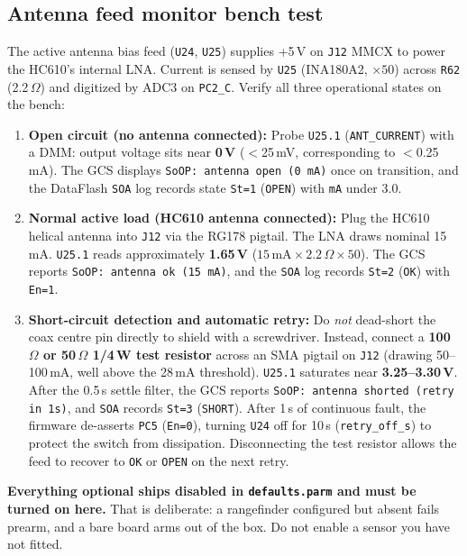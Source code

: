 \documentclass[11pt,a4paper]{article}
\newcommand{\file}[1]{\texttt{\small #1}}
\newcommand{\cmd}[1]{\texttt{\small #1}}
\begin{document}
\subsection{Antenna feed monitor bench test}
\label{sec:ant_bench}
The active antenna bias feed (\file{U24}, \file{U25}) supplies +5\,V on \file{J12} MMCX to power the HC610's internal LNA. Current is sensed by \file{U25} (INA180A2, $\times 50$) across \file{R62} (2.2\,$\Omega$) and digitized by ADC3 on \file{PC2\_C}. Verify all three operational states on the bench:
\begin{enumerate}
\item \textbf{Open circuit (no antenna connected):} Probe \file{U25.1} (\file{ANT\_CURRENT}) with a DMM: output voltage sits near \textbf{0\,V} ($<$25\,mV, corresponding to $<$0.25\,mA). The GCS displays \cmd{SoOP: antenna open (0 mA)} once on transition, and the DataFlash \file{SOA} log records state \file{St=1} (\cmd{OPEN}) with \file{mA} under 3.0.
\item \textbf{Normal active load (HC610 antenna connected):} Plug the HC610 helical antenna into \file{J12} via the RG178 pigtail. The LNA draws nominal 15\,mA. \file{U25.1} reads approximately \textbf{1.65\,V} ($15\,\mathrm{mA} \times 2.2\,\Omega \times 50$). The GCS reports \cmd{SoOP: antenna ok (15 mA)}, and the \file{SOA} log records \file{St=2} (\cmd{OK}) with \file{En=1}.
\item \textbf{Short-circuit detection and automatic retry:} Do \emph{not} dead-short the coax centre pin directly to shield with a screwdriver. Instead, connect a \textbf{100\,$\Omega$ or 50\,$\Omega$ 1/4\,W test resistor} across an SMA pigtail on \file{J12} (drawing 50--100\,mA, well above the 28\,mA threshold). \file{U25.1} saturates near \textbf{3.25--3.30\,V}. After the 0.5\,s settle filter, the GCS reports \cmd{SoOP: antenna shorted (retry in 1s)}, and \file{SOA} records \file{St=3} (\cmd{SHORT}). After 1\,s of continuous fault, the firmware de-asserts \file{PC5} (\cmd{En=0}), turning \file{U24} off for 10\,s (\file{retry\_off\_s}) to protect the switch from dissipation. Disconnecting the test resistor allows the feed to recover to \cmd{OK} or \cmd{OPEN} on the next retry.
\end{enumerate}

\textbf{Everything optional ships disabled in \file{defaults.parm} and must be turned on
here.} That is deliberate: a rangefinder configured but absent fails prearm, and a bare
board arms out of the box. Do not enable a sensor you have not fitted.
\end{document}
